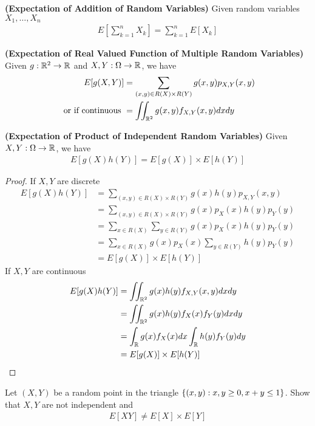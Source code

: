 \documentclass{report}
\begin{document}
\begin{theorem}
\label{4.3.3}
\textbf{(Expectation of Addition of Random Variables)} Given random variables $X_1,\dots, X_n$
\begin{align*}
E[\sum_{k=1}^n X_k]=\sum_{k=1}^n E[X_k]
\end{align*}
\end{theorem}
\begin{theorem}
\label{4.3.4}
\textbf{(Expectation of Real Valued Function of Multiple Random Variables)} Given $g:\mathbb{R}^2\rightarrow \mathbb{R}$ and $X,Y:\Omega \rightarrow \mathbb{R}$, we have 
\begin{align*}
E[g(X,Y)]&=\sum_{(x,y)\in R(X)\times R(Y)} g(x,y)p_{X,Y}(x,y)\\
\text{ or if continuous }&=\iint_{\mathbb{R}^2} g(x,y)f_{X,Y}(x,y)dxdy
\end{align*}
\end{theorem}
\begin{corollary}
\label{4.3.5}
\textbf{(Expectation of Product of Independent Random Variables)} Given $X,Y:\Omega \rightarrow \mathbb{R}$, we have 
\begin{align*}
E[g(X)h(Y)]=E[g(X)]\times E[h(Y)]
\end{align*}
\end{corollary}
\begin{proof}
If $X,Y$ are discrete 
 \begin{align*}
E[g(X)h(Y)]&=\sum_{(x,y)\in R(X)\times R(Y)} g(x)h(y)p_{X,Y}(x,y)\\
&=\sum_{(x,y)\in R(X)\times R(Y)}g(x)p_X(x)h(y)p_Y(y)\\
&=\sum_{x\in R(X)}\sum_{y \in R(Y)}g(x)p_X(x)h(y)p_Y(y)\\
&=\sum_{x\in R(X)}g(x)p_X(x) \sum_{y \in R(Y)}h(y)p_Y(y)\\
&=E[g(X)]\times E[h(Y)]
\end{align*}
If $X,Y$ are continuous 
 \begin{align*}
E[g(X)h(Y)]&= \iint_{\mathbb{R}^2} g(x)h(y)f_{X,Y}(x,y)dxdy\\
&=\iint_{\mathbb{R}^2}g(x)h(y)f_X(x)f_Y(y)dxdy\\
&=\int_{\mathbb{R}} g(x)f_X(x)dx\int_{\mathbb{R}} h(y)f_Y(y)dy\\
&=E[g(X)]\times E[h(Y)]
\end{align*}
\end{proof}
\begin{question}{}{}
Let $(X,Y)$ be a random point in the triangle $\{ (x,y):x,y\geq 0,x+y\leq 1 \}$. Show that $X,Y$ are not independent and  
\begin{align*}
E[XY]\neq E[X]\times E[Y]
\end{align*}
\end{question}
\end{document}
